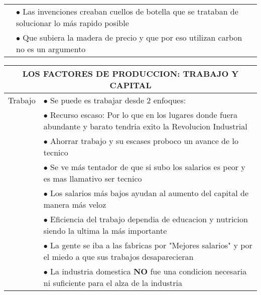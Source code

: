 \begin{tabular}{p{3cm}|p{12cm}}
                               & $\bullet$ Las invenciones creaban cuellos de botella que se trataban de solucionar lo más rapido posible                                                                  \\
                               & $\bullet$ Que subiera la madera de precio y que por eso utilizan carbon no es un argumento
\end{tabular}
\endgroup

\begingroup
\setlength{\tabcolsep}{12pt} %
\renewcommand{\arraystretch}{1.5} %
\begin{tabular}{p{3cm}|p{11cm}}
  \multicolumn{2}{c}{\large LOS FACTORES DE PRODUCCION: TRABAJO Y CAPITAL}                                                                                          \\ \hline
  Trabajo & $\bullet$ Se puede es trabajar desde 2 enfoques:                                                                                                        \\
          & \hspace{1cm} $\bullet$ Recurso escaso: Por lo que en los lugares donde fuera abundante y barato tendria exito la Revolucion Industrial                  \\
          & \hspace{1cm} $\bullet$ Ahorrar trabajo y su escases proboco un avance de lo tecnico                                                                     \\
          & $\bullet$ Se ve más tentador de que si subo los salarios es peor y es mas llamativo ser tecnico                                                         \\
          & $\bullet$ Los salarios más bajos ayudan al aumento del capital de manera más veloz                                                                      \\
          & $\bullet$ Eficiencia del trabajo dependia de educacion y nutricion siendo la ultima la más importante                                                   \\
          & $\bullet$ La gente se iba a las fabricas por "Mejores salarios" y por el miedo a que sus trabajos desaparecieran                                        \\
          & $\bullet$ La industria domestica {\bf NO} fue una condicion necesaria ni suficiente para el alza de la industria                                        \\

\end{tabular}

